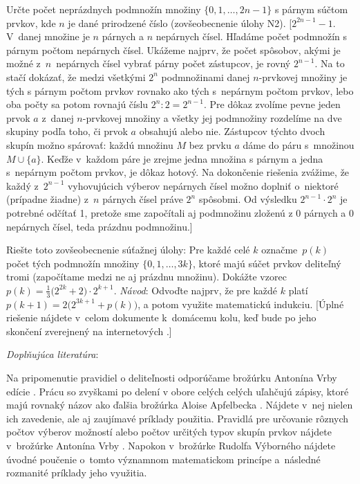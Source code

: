 {Určte počet neprázdnych podmnožín množiny
$\{0,1,\ldots,2n-1\}$ s párnym súčtom prvkov, kde $n$ je
dané prirodzené číslo (zovšeobecnenie úlohy N2).
[$2^{2n-1}-1$. V~danej množine je $n$ párnych a $n$ nepárnych čísel.
Hľadáme počet podmnožín s párnym počtom nepárnych čísel. Ukážeme
najprv, že počet spôsobov, akými je možné z~$n$~nepárnych čísel vybrať
párny počet zástupcov, je rovný $2^{n-1}$. Na to stačí
dokázať, že medzi všetkými
$2^n$ podmnožinami danej $n$-prvkovej množiny je tých s párnym
počtom prvkov rovnako ako tých s~nepárnym počtom prvkov, lebo oba
počty sa potom rovnajú číslu $2^n:2=2^{n-1}$. Pre dôkaz zvolíme pevne
jeden prvok $a$ z~danej $n$-prvkovej množiny a všetky jej
podmnožiny rozdelíme na dve skupiny podľa toho, či prvok $a$
obsahujú alebo nie. Zástupcov týchto dvoch skupín možno spárovať:
každú množinu $M$ bez prvku $a$ dáme do páru s~množinou $M \cup \{a\}$.
Keďže v~každom páre je zrejme jedna množina s párnym a jedna s~nepárnym
počtom prvkov, je dôkaz hotový. Na dokončenie riešenia zvážime, že
každý z~$2^{n-1}$ vyhovujúcich výberov nepárnych čísel možno doplniť
o~niektoré (prípadne žiadne) z~$n$ párnych čísel práve $2^n$ spôsobmi.
Od výsledku ${2^{n-1}\cdot2^n}$ je potrebné odčítať 1, pretože sme
započítali aj podmnožinu zloženú z 0 párnych a 0 nepárnych čísel,
teda prázdnu podmnožinu.]

Riešte toto zovšeobecnenie súťažnej úlohy:
Pre každé celé $k$ označme~$p(k)$ počet tých podmnožín množiny
$\{0,1,\ldots,3k\}$, ktoré majú súčet prvkov deliteľný
tromi (započítame medzi ne aj prázdnu množinu). Dokážte vzorec
$p(k)=\frac13\bigl(2^{2k}+2\bigr)\cdot2^{k+1}$.
{\it Návod}: Odvoďte najprv, že pre každé $k$ platí
$p(k+1)=2\bigl(2^{3k+1}+p(k)\bigr)$, a potom využite
matematickú indukciu.
[Úplné riešenie nájdete v~celom dokumente k~domácemu kolu, keď bude po jeho skončení zverejnený
na internetových .]


{\everypar{}
\smallskip
\emph{Doplňujúca literatúra}:

Na pripomenutie pravidiel o deliteľnosti odporúčame
brožúrku Antonína Vrby  edície . Prácu so zvyškami po delení v obore celých celých
uľahčujú zápisy, ktoré majú rovnaký názov ako ďalšia brožúrka Aloise Apfelbecka
.
Nájdete v~nej nielen ich zavedenie, ale aj zaujímavé príklady použitia.
Pravidlá pre určovanie rôznych  počtov výberov možností
alebo počtov určitých typov skupín prvkov nájdete v~brožúrke Antonína Vrby
.
Napokon v~brožúrke Rudolfa Výborného
nájdete úvodné poučenie o~tomto významnom matematickom princípe
a~následné rozmanité príklady jeho využitia.
\smallskip
}

}

